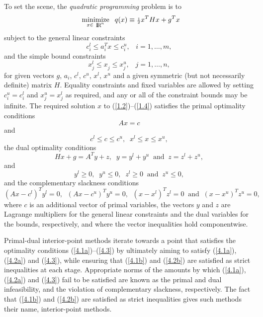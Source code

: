 \documentclass[acmtocl,acmnow]{acmtrans2m}
\newcommand{\minin}[1]{ {\renewcommand{\arraystretch}{0.8}
                     \begin{array}[t]{c}
                     \mbox{minimize} \vspace*{-1mm} \\
                     \mbox{ $\scriptstyle #1 $ }
                     \end{array} \;} }
\newcommand{\tim}[1]{\;\; \mbox{#1} \;\;}
\newcommand{\req}[1]{(\ref{#1})}
\newcommand{\sfrac}[2]{{\scriptstyle \frac{#1}{#2}}}
\newcommand{\half}{\sfrac{1}{2}}
\newcommand{\eqn}[2]{\begin{equation}\label{#1}{#2}\end{equation}}
\newcommand{\smallRe}
     {\mbox{\raisebox{-0.8pt}{\footnotesize I\hskip -1.5pt R\hskip -0.5pt}}}
\begin{document}
To set the scene, the {\em quadratic programming} problem is to
\eqn{1.2}{\minin{x \in \smallRe^n} q(x) \equiv
\half x^T H x + g^T x}
subject to the general linear constraints
\eqn{1.3}{c_{i}^{l}  \leq  a_{i}^{T}x  \leq  c_{i}^{u}, \;\;\;
 i = 1, \ldots , m,}
and the simple bound constraints
\eqn{1.4}{x_{j}^{l}  \leq  x_{j}^{ } \leq  x_{j}^{u} , \;\;\;
 j = 1, \ldots , n,}
for given
vectors $g$, $a_{i}$, $c^{l}$, $c^{u}$, $x^{l}$, $x^{u}$
and a given symmetric (but not necessarily definite) matrix $H$. Equality
constraints and fixed variables are allowed by setting
$c_{i}^{u} = c_{i}^{l}$ and $x_{j}^{u} = x_{j}^{l}$ as required,
and any or all of the constraint bounds may be infinite.
The required solution $x$ to \req{1.2}--\req{1.4} satisfies
the primal optimality conditions
\eqn{4.1a}{A x = c}
and
\eqn{4.1b}{
 c^{l} \leq c \leq c^{u}, \;\;
x^{l} \leq x \leq x^{u},}
the dual optimality conditions
\eqn{4.2a}{
 H x + g =
 A^{T} y + z,\;\;
 y = y^{l} + y^{u} \tim{and}
 z = z^{l} + z^{u} ,}
and
\eqn{4.2b}{
 y^{l} \geq 0 , \;\;
 y^{u} \leq 0 , \;\;
 z^{l} \geq 0 \;\; \mbox{and} \;\;
 z^{u} \leq 0 ,}
and the complementary slackness conditions
\eqn{4.3}{
( A x - c^{l} )^{T} y^{l} = 0  ,\;\;
( A x - c^{u} )^{T} y^{u} = 0  ,\;\;
(x -x^{l} )^{T} z^{l} = 0   \tim{and}
(x -x^{u} )^{T} z^{u} = 0 ,}
where $c$ is an additional vector of primal variables,
the vectors $y$ and $z$ are Lagrange multipliers for
the general linear constraints and the dual variables for the bounds,
respectively, and where the vector inequalities hold componentwise.

Primal-dual interior-point methods iterate towards a point
that satisfies the optimality conditions \req{4.1a}--\req{4.3}
by ultimately aiming to satisfy
\req{4.1a}, \req{4.2a} and \req{4.3}, while ensuring that
\req{4.1b} and \req{4.2b} are
satisfied as strict inequalities at each stage.
Appropriate norms of the amounts by
which \req{4.1a}, \req{4.2a} and \req{4.3} fail to be satisfied are known as the
primal and dual infeasibility, and the violation of complementary slackness,
respectively. The fact that \req{4.1b} and \req{4.2b} are satisfied as strict
inequalities gives such methods their name, interior-point methods.
\end{document}
